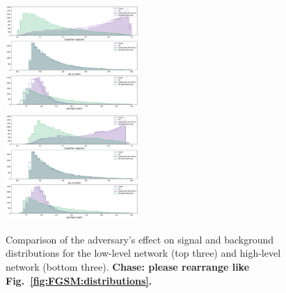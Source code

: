 \documentclass[reprint,nofootinbib,...]{revtex4-1}
\begin{document}
\begin{figure}[h!]
\centering
\includegraphics[width=0.45\textwidth]{figures/adv_classifer_response.pdf}\\
\includegraphics[width=0.45\textwidth]{figures/adv_classifer_response_HL.pdf}
\caption{
Comparison of the adversary's effect on signal and background distributions for the low-level network (top three) and high-level network (bottom three). \textbf{Chase: please rearrange like Fig.~\ref{fig:FGSM:distributions}.}
\label{fig:distributionsadversary}
}
\end{figure}
\end{document}
